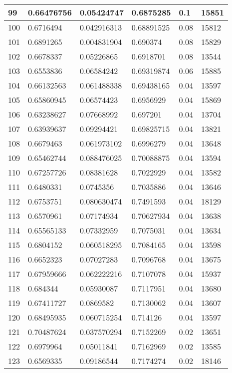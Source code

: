 \begin{longtable}{|l|l|l|l|l|l|}
99 & 0.66476756 & 0.05424747 & 0.6875285 & 0.1 & 15851 \\ \hline 
100 & 0.6716494 & 0.042916313 & 0.68891525 & 0.08 & 15812 \\ \hline 
101 & 0.6891265 & 0.004831904 & 0.690374 & 0.08 & 15829 \\ \hline 
102 & 0.6678337 & 0.05226865 & 0.6918701 & 0.08 & 13544 \\ \hline 
103 & 0.6553836 & 0.06584242 & 0.69319874 & 0.06 & 15885 \\ \hline 
104 & 0.66132563 & 0.061488338 & 0.69438165 & 0.04 & 13597 \\ \hline 
105 & 0.65860945 & 0.06574423 & 0.6956929 & 0.04 & 15869 \\ \hline 
106 & 0.63238627 & 0.07668992 & 0.697201 & 0.04 & 13704 \\ \hline 
107 & 0.63939637 & 0.09294421 & 0.69825715 & 0.04 & 13821 \\ \hline 
108 & 0.6679463 & 0.061973102 & 0.6996279 & 0.04 & 13648 \\ \hline 
109 & 0.65462744 & 0.088476025 & 0.70088875 & 0.04 & 13594 \\ \hline 
110 & 0.67257726 & 0.08381628 & 0.7022929 & 0.04 & 13582 \\ \hline 
111 & 0.6480331 & 0.0745356 & 0.7035886 & 0.04 & 13646 \\ \hline 
112 & 0.6753751 & 0.080630474 & 0.7491593 & 0.04 & 18129 \\ \hline 
113 & 0.6570961 & 0.07174934 & 0.70627934 & 0.04 & 13638 \\ \hline 
114 & 0.65565133 & 0.07332959 & 0.7075031 & 0.04 & 13634 \\ \hline 
115 & 0.6804152 & 0.060518295 & 0.7084165 & 0.04 & 13598 \\ \hline 
116 & 0.6652323 & 0.07027283 & 0.7096768 & 0.04 & 13675 \\ \hline 
117 & 0.67959666 & 0.062222216 & 0.7107078 & 0.04 & 15937 \\ \hline 
118 & 0.684344 & 0.05930087 & 0.7117951 & 0.04 & 13680 \\ \hline 
119 & 0.67411727 & 0.0869582 & 0.7130062 & 0.04 & 13607 \\ \hline 
120 & 0.68495935 & 0.060715254 & 0.714126 & 0.04 & 13597 \\ \hline 
121 & 0.70487624 & 0.037570294 & 0.7152269 & 0.02 & 13651 \\ \hline 
122 & 0.6979964 & 0.05011841 & 0.7162969 & 0.02 & 13585 \\ \hline 
123 & 0.6569335 & 0.09186544 & 0.7174274 & 0.02 & 18146 \\ \hline 

\end{longtable}
